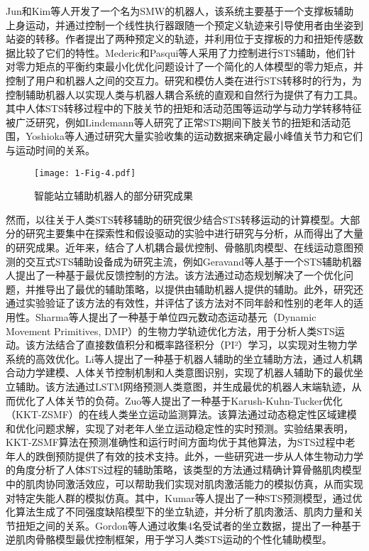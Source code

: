 Jun和Kim等人\cite{hong-guljunWalkingSittostandSupport2011,inhokimKinematicAnalysisSittostand2011}开发了一个名为SMW的机器人，该系统主要基于一个支撑板辅助上身运动，并通过控制一个线性执行器跟随一个预定义轨迹来引导使用者由坐姿到站姿的转移。作者提出了两种预定义的轨迹，并利用位于支撑板的力和扭矩传感数据比较了它们的特性。Mederic和Pasqui等人\cite{medericElderlyPeopleSit2006}采用了力控制进行STS辅助，他们针对零力矩点的平衡约束最小化优化问题设计了一个简化的人体模型的零力矩点，并控制了用户和机器人之间的交互力。研究和模仿人类在进行STS转移时的行为，为控制辅助机器人以实现人类与机器人耦合系统的直观和自然行为提供了有力工具。其中人体STS转移过程中的下肢关节的扭矩和活动范围等运动学与动力学转移特征被广泛研究，例如Lindemann等人\cite{galliQuantitativeAnalysisSit2008}研究了正常STS期间下肢关节的扭矩和活动范围，Yoshioka等人\cite{yoshiokaBiomechanicalAnalysisRelation2009}通过研究大量实验收集的运动数据来确定最小峰值关节力和它们与运动时间的关系。

\begin{figure}[h]
  \centering
  \texttt{[image: 1-Fig-4.pdf]}
  \caption{智能站立辅助机器人的部分研究成果}
  \label{fig:1-4}
\end{figure}

然而，以往关于人类STS转移辅助的研究很少结合STS转移运动的计算模型。大部分的研究主要集中在探索性和假设驱动的实验中进行研究与分析，从而得出了大量的研究成果。近年来，结合了人机耦合最优控制、骨骼肌肉模型、在线运动意图预测的交互式STS辅助设备成为研究主流，例如Geravand等人\cite{geravandHumanSittostandTransfer2017}基于一个STS辅助机器人提出了一种基于最优反馈控制的方法。该方法通过动态规划解决了一个优化问题，并推导出了最优的辅助策略，以提供由辅助机器人提供的辅助。此外，研究还通过实验验证了该方法的有效性，并评估了该方法对不同年龄和性别的老年人的适用性。Sharma等人\cite{sharmaBiomechanicalTrajectoryOptimization2022,sharmaPhysicalHumanRobotInteraction2022}提出了一种基于单位四元数动态运动基元（Dynamic Movement Primitives, DMP）的生物力学轨迹优化方法，用于分析人类STS运动。该方法结合了直接数值积分和概率路径积分（PI²）学习，以实现对生物力学系统的高效优化。Li等人\cite{liIntegratedApproachRobotic2021,liHumanCenteredControlFramework2018}提出了一种基于机器人辅助的坐立辅助方法，通过人机耦合动力学建模、人体关节控制机制和人类意图识别，实现了机器人辅助下的最优坐立辅助。该方法通过LSTM网络预测人类意图，并生成最优的机器人末端轨迹，从而优化了人体关节的负荷。Zuo等人\cite{zuoOnlineMonitoringHuman2023}提出了一种基于Karush-Kuhn-Tucker优化（KKT-ZSMF）的在线人类坐立运动监测算法。该算法通过动态稳定性区域建模和优化问题求解，实现了对老年人坐立运动稳定性的实时预测。实验结果表明，KKT-ZSMF算法在预测准确性和运行时间方面均优于其他算法，为STS过程中老年人的跌倒预防提供了有效的技术支持。此外，一些研究进一步从人体生物动力学的角度分析了人体STS过程的辅助策略，该类型的方法通过精确计算骨骼肌肉模型中的肌肉协同激活效应，可以帮助我们实现对肌肉激活能力的模拟仿真，从而实现对特定失能人群的模拟仿真。其中，Kumar等人\cite{kumarPredictingSittoStandAdaptations2022}提出了一种STS预测模型，通过优化算法生成了不同强度缺陷模型下的坐立轨迹，并分析了肌肉激活、肌肉力量和关节扭矩之间的关系。Gordon等人\cite{gordonLearningPersonalisedHuman2023a}通过收集4名受试者的坐立数据，提出了一种基于逆肌肉骨骼模型最优控制框架，用于学习人类STS运动的个性化辅助模型。

